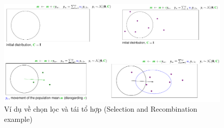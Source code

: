 \documentclass{book}
\begin{document}
\begin{itemize}
\begin{equation*}
\begin{aligned}
        \end{aligned}
    \end{equation*}
    \begin{figure}[H]
        \centering
        \includegraphics[width=\textwidth]{images/selection_and_recombination.png}
        \caption{Ví dụ về chọn lọc và tái tổ hợp (Selection and Recombination example)}
        \label{fig:selection_and_recombination}
    \end{figure}
\end{itemize}
\end{document}
